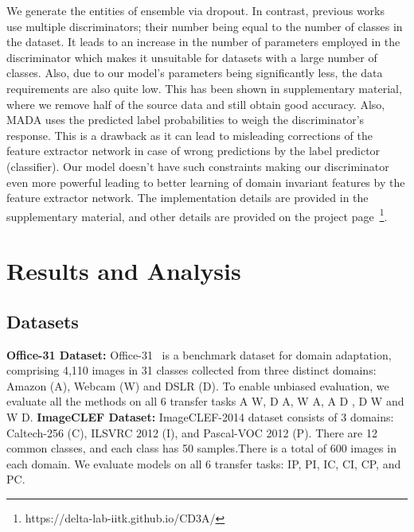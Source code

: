 \documentclass{bmvc2k}
\begin{document}
We generate the entities of ensemble via dropout. In contrast, previous works~\cite{pei_arxiv2018} use multiple discriminators; their number being equal to the number of classes in the dataset. It leads to an increase in the number of parameters employed in the discriminator which makes it unsuitable for datasets with a large number of classes. Also, due to our model's parameters being significantly less, the data requirements are also quite low. This has been shown in supplementary material, where we remove half of the source data and still obtain good accuracy. Also, MADA uses the predicted label probabilities to weigh the discriminator's response. This is a drawback as it can lead to misleading corrections of the feature extractor network in case of wrong predictions by the label predictor (classifier). Our model doesn't have such constraints making our discriminator even more powerful leading to better learning of domain invariant features by the feature extractor network. 
The implementation details are provided in the supplementary material, and other details are provided on the project page~\footnote{https://delta-lab-iitk.github.io/CD3A/}.











\section{ Results and Analysis}
\subsection{Datasets}
 \textbf{{Office-31 Dataset:}}
Office-31~\cite{saenko_ECCV2010} is a benchmark dataset for domain adaptation, comprising 4,110 images in 31 classes collected from three distinct domains: Amazon (A), Webcam (W) and DSLR (D). To enable unbiased evaluation, we evaluate all the methods on all 6 transfer tasks A  W, D  A, W  A, A  D , D  W and W  D.
\newline
\textbf{{ImageCLEF Dataset:}}
ImageCLEF-2014 dataset consists of 3 domains: Caltech-256 (C), ILSVRC 2012 (I), and Pascal-VOC 2012 (P). There are 12 common classes, and each class has 50 samples.There is a total of 600 images in each domain. We evaluate models on all 6 transfer tasks: IP, PI, IC, CI, CP, and PC. 
\end{document}
